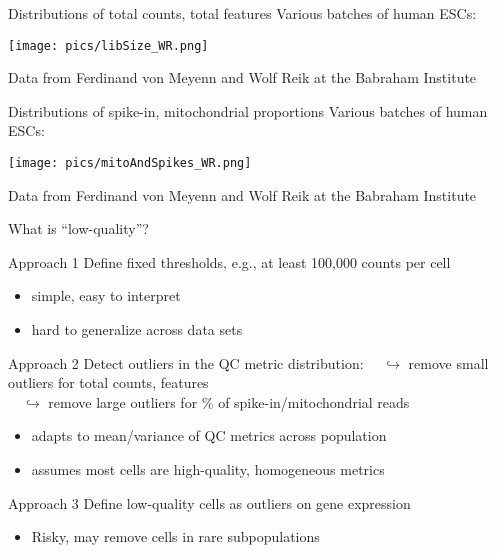 \documentclass{beamer}
\begin{document}
\begin{frame}{Distributions of total counts, total features}
    Various batches of human ESCs:
    \begin{center}
        \texttt{[image: pics/libSize\_WR.png]}
    \end{center}
    {\tiny Data from Ferdinand von Meyenn and Wolf Reik at the Babraham Institute}
\end{frame}
    
\begin{frame}{Distributions of spike-in, mitochondrial proportions}
    Various batches of human ESCs:
    \begin{center}
        \texttt{[image: pics/mitoAndSpikes\_WR.png]}
    \end{center}
    {\tiny Data from Ferdinand von Meyenn and Wolf Reik at the Babraham Institute}
\end{frame}

\begin{frame}{What is ``low-quality''?}
    \begin{exampleblock}{Approach 1}
        Define fixed thresholds, e.g., at least 100,000 counts per cell
        \begin{itemize}
            \item simple, easy to interpret
            \item hard to generalize across data sets 
        \end{itemize}
    \end{exampleblock}
    \pause
    \begin{exampleblock}{Approach 2}
        Detect outliers in the QC metric distribution:
        $\quad\hookrightarrow$ remove small outliers for total counts, features \\
        $\quad\hookrightarrow$ remove large outliers for \% of spike-in/mitochondrial reads
        \begin{itemize}
            \item adapts to mean/variance of QC metrics across population
            \item assumes most cells are high-quality, homogeneous metrics
        \end{itemize}
    \end{exampleblock}
    \pause
    \begin{alertblock}{Approach 3}
        Define low-quality cells as outliers on gene expression
        \begin{itemize}
            \item Risky, may remove cells in rare subpopulations
        \end{itemize}
    \end{alertblock}
\end{frame}
\end{document}
